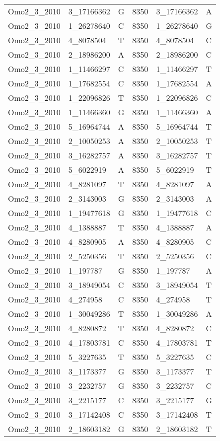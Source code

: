 \begin{center}
\begin{longtable}{|l|l|l|l|l|l|}
Omo2\_3\_2010&3\_17166362&G&8350&3\_17166362&A\\
Omo2\_3\_2010&1\_26278640&C&8350&1\_26278640&G\\
Omo2\_3\_2010&4\_8078504&T&8350&4\_8078504&C\\
Omo2\_3\_2010&2\_18986200&A&8350&2\_18986200&C\\
Omo2\_3\_2010&1\_11466297&C&8350&1\_11466297&T\\
Omo2\_3\_2010&1\_17682554&C&8350&1\_17682554&A\\
Omo2\_3\_2010&1\_22096826&T&8350&1\_22096826&C\\
Omo2\_3\_2010&1\_11466360&G&8350&1\_11466360&A\\
Omo2\_3\_2010&5\_16964744&A&8350&5\_16964744&T\\
Omo2\_3\_2010&2\_10050253&A&8350&2\_10050253&T\\
Omo2\_3\_2010&3\_16282757&A&8350&3\_16282757&T\\
Omo2\_3\_2010&5\_6022919&A&8350&5\_6022919&T\\
Omo2\_3\_2010&4\_8281097&T&8350&4\_8281097&A\\
Omo2\_3\_2010&2\_3143003&G&8350&2\_3143003&A\\
Omo2\_3\_2010&1\_19477618&G&8350&1\_19477618&C\\
Omo2\_3\_2010&4\_1388887&T&8350&4\_1388887&A\\
Omo2\_3\_2010&4\_8280905&A&8350&4\_8280905&C\\
Omo2\_3\_2010&2\_5250356&T&8350&2\_5250356&C\\
Omo2\_3\_2010&1\_197787&G&8350&1\_197787&A\\
Omo2\_3\_2010&3\_18949054&C&8350&3\_18949054&T\\
Omo2\_3\_2010&4\_274958&C&8350&4\_274958&T\\
Omo2\_3\_2010&1\_30049286&T&8350&1\_30049286&A\\
Omo2\_3\_2010&4\_8280872&T&8350&4\_8280872&C\\
Omo2\_3\_2010&4\_17803781&C&8350&4\_17803781&T\\
Omo2\_3\_2010&5\_3227635&T&8350&5\_3227635&C\\
Omo2\_3\_2010&3\_1173377&G&8350&3\_1173377&T\\
Omo2\_3\_2010&3\_2232757&G&8350&3\_2232757&C\\
Omo2\_3\_2010&3\_2215177&C&8350&3\_2215177&G\\
Omo2\_3\_2010&3\_17142408&C&8350&3\_17142408&T\\
Omo2\_3\_2010&2\_18603182&G&8350&2\_18603182&T\\

\end{longtable}
\end{center}
